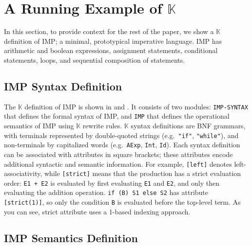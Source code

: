\documentclass{article}
\theoremstyle{definition}
\newcommand{\K}{$\mathbb{K}$\xspace}
\newcommand{\kcode}[1]{\texttt{#1}}
\newcommand{\IMP}{\textsf{IMP}\xspace}
\begin{document}
\section{A Running Example of \K} \label{sec:imp}
In this section, to provide context for the rest of the paper, we show a \K
definition of \IMP; a minimal, prototypical imperative language. \IMP has
arithmetic and boolean expressions, assignment statements, conditional
statements, loops, and sequential composition of statements.






\subsection{\IMP Syntax Definition}

The \K definition of \IMP is shown in  and . It consists of two
modules: \kcode{IMP-SYNTAX} that defines the formal syntax of \IMP, and
\kcode{IMP} that defines the operational semantics of \IMP using \K rewrite
rules. \K syntax definitions are BNF grammars, with terminals represented by
double-quoted strings (e.g.\ \kcode{"if"}, \kcode{"while"}), and non-terminals by
capitalized words (e.g.\ \kcode{AExp}, \kcode{Int}, \kcode{Id}). Each syntax
definition can be associated with attributes in square brackets; these
attributes encode additional syntactic and semantic information. For example,
\kcode{[left]} denotes left-associativity, while \kcode{[strict]} means that the
production has a strict evaluation order: \kcode{E1 + E2} is evaluated by first
evaluating \kcode{E1} and \kcode{E2}, and only then evaluating the addition
operation. \kcode{if (B) S1 else S2} has attribute \kcode{[strict(1)]}, so only
the condition \kcode{B} is evaluated before the top-level term. As you can see, strict attribute uses a 1-based indexing approach.

\subsection{\IMP Semantics Definition}
\end{document}

